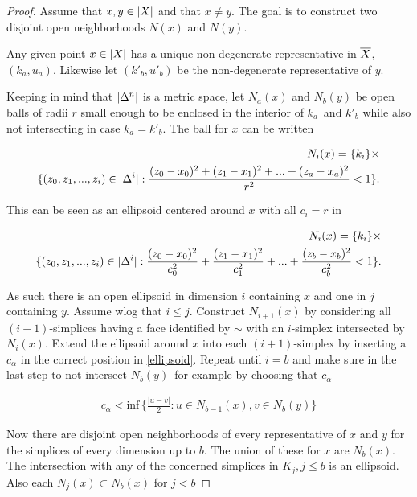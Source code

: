 \documentclass[../../main.tex]{subfiles}
\begin{document}
    \begin{proof}
        Assume that $x, y \in \geom[X]$ and that $x \neq y$. The goal is to construct two disjoint open neighborhoods $N(x)$ and $N(y)$.

        Any given point $x \in \geom[X]$ has a unique non-degenerate representative in $\bigGeom X$, $(k_a, u_a)$. Likewise let $(k'_b, u'_b)$ be the non-degenerate representative of $y$.

        Keeping in mind that $\geom[\Delta^n]$ is a metric space, let $N_a(x)$ and $N_b(y)$ be open balls of radii $r$ small enough to be enclosed in the interior of $k_a$ and $k'_b$ while also not intersecting in case $k_a=k'_b$. The ball for $x$ can be written 
        
        \begin{align*}
            N_i(x) = \{k_i\} \times \\
            \{(z_0, z_1, ..., z_i) \in \geom[\Delta^i]: \frac{(z_0-x_0)^2 + (z_1-x_1)^2 + ... + (z_a-x_a)^2}{r^2} < 1 \}.
        \end{align*}

        This can be seen as an ellipsoid centered around $x$ with all $c_i = r$ in

        \begin{align}\label{ellipsoid}
            N_i(x) = \{k_i\} \times \nonumber \\
            \{(z_0, z_1, ..., z_i) \in \geom[\Delta^i]: \frac{(z_0-x_0)^2}{c_0^2} + \frac{(z_1-x_1)^2}{c_1^2} + ... + \frac{(z_b-x_b)^2}{c_b^2} < 1 \}.
        \end{align}

        As such there is an open ellipsoid in dimension $i$ containing $x$ and one in $j$ containing $y$. Assume wlog that $i \leq j$. Construct $N_{i+1}(x)$ by considering all $(i+1)$-simplices having a face identified by $\sim$ with an $i$-simplex intersected by $N_i(x)$. Extend the ellipsoid around $x$ into each $(i+1)$-simplex by inserting a $c_\alpha$ in the correct position in \eqref{ellipsoid}. Repeat until $i = b$ and make sure in the last step to not intersect $N_b(y)$ for example by choosing that $c_\alpha$

        \begin{align}\label{distance}
            c_\alpha < \text{inf}\,\{\frac{|u-v|}{2}: u \in N_{b-1}(x), v \in N_b(y)\}
        \end{align}

        Now there are disjoint open neighborhoods of every representative of $x$ and $y$ for the simplices of every dimension up to $b$. The union of these for $x$ are $N_b(x)$. The intersection with any of the concerned simplices in $K_j, j \leq b$ is an ellipsoid. Also each $N_j(x) \subset N_b(x)$ for $j < b$


\end{proof}
\end{document}
